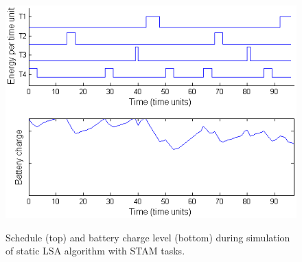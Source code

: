 \begin{figure}[tb]
\begin{center}
\includegraphics[scale=0.57]{lsastambattery.png}
\label{fig:lsastambattery}
\caption{Schedule (top) and battery charge level (bottom) during simulation of static LSA algorithm with STAM tasks.}
\end{center}
\end{figure}

